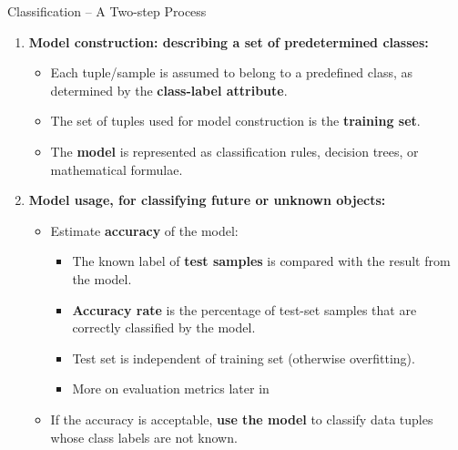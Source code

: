 \begin{frame}{Classification -- A Two-step Process}
	\begin{enumerate}
		\item \textbf{Model construction: describing a set of predetermined classes:}
		      \begin{itemize}
			      \item Each tuple/sample is assumed to belong to a predefined class, as determined by the \textbf{\color{airforceblue}class-label attribute}.
			      \item The set of tuples used for model construction is the \textbf{\color{airforceblue}training set}.
			      \item The \textbf{\color{airforceblue}model} is represented as classification rules, decision trees, or mathematical formulae.
		      \end{itemize}
		\item \textbf{Model usage, for classifying future or unknown objects:}
		      \begin{itemize}
			      \item Estimate \textbf{\color{airforceblue}accuracy} of the model:
			            \begin{itemize}
				            \item The known label of \textbf{test samples} is compared with the result from the model.
				            \item \textbf{Accuracy rate} is the percentage of test-set samples that are correctly classified by the model.
				            \item Test set is independent of training set (otherwise overfitting).
				            \item More on evaluation metrics later in 
			            \end{itemize}
			      \item If the accuracy is acceptable, \textbf{\color{airforceblue}use the model} to classify data tuples whose class labels are not known.
		      \end{itemize}
	\end{enumerate}
\end{frame}

